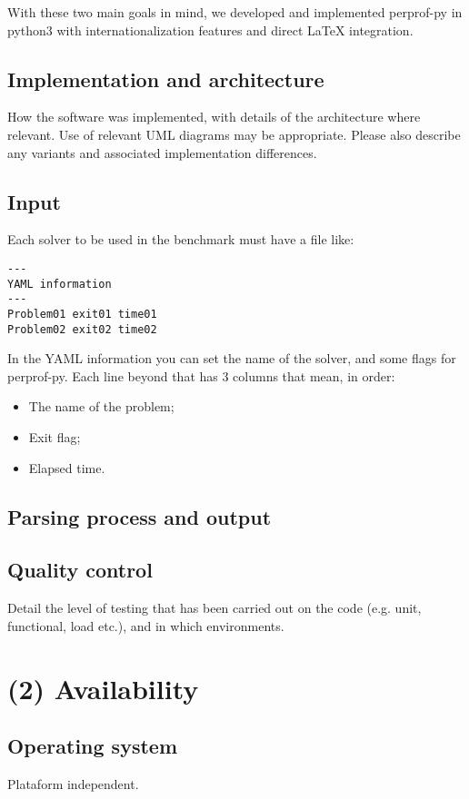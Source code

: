 \documentclass[10pt,a4paper]{article}
\begin{document}
    With these two main goals in mind, we developed and implemented perprof-py in python3 with internationalization features and direct LaTeX integration.



\subsection*{Implementation and architecture}
How the software was implemented, with details of the architecture where relevant. Use of relevant UML diagrams may be appropriate. Please also describe any variants and associated implementation differences.

\subsection*{Input}
    Each solver to be used in the benchmark must have a file like:

    \begin{verbatim}
---
YAML information
---
Problem01 exit01 time01
Problem02 exit02 time02
    \end{verbatim}

    In the YAML information you can set the name of the solver, and some
    flags for perprof-py.
    Each line beyond that has 3 columns that mean, in order:
    \begin{itemize}
      \item The name of the problem;
      \item Exit flag;
      \item Elapsed time.
    \end{itemize}

\subsection*{Parsing process and output}

\subsection*{Quality control}
Detail the level of testing that has been carried out on the code (e.g. unit, functional, load etc.), and in which environments.

\section*{(2) Availability}

\subsection*{Operating system}
Plataform independent.
\end{document}

